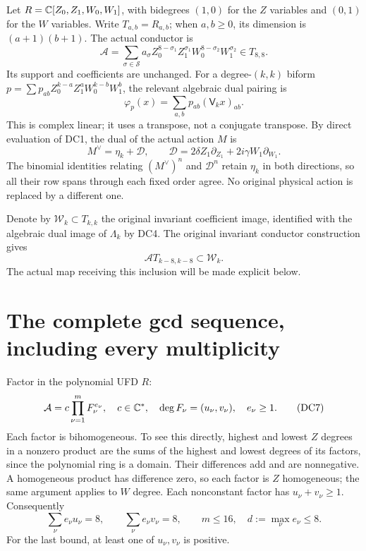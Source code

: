 \documentclass[11pt]{article}
\begin{document}
Let $R=\mathbb C[Z_0,Z_1,W_0,W_1]$, with bidegrees $(1,0)$ for the $Z$
variables and $(0,1)$ for the $W$ variables.  Write $T_{a,b}=R_{a,b}$;
when $a,b\ge0$, its dimension is $(a+1)(b+1)$.  The actual conductor is
\[
 \mathcal A=\sum_{\sigma\in\mathcal S}a_\sigma
 Z_0^{8-\sigma_1}Z_1^{\sigma_1}
 W_0^{8-\sigma_2}W_1^{\sigma_2}\in T_{8,8}.                       \tag{DC3}
\]
Its support and coefficients are unchanged.  For a degree-$(k,k)$
biform $p=\sum p_{ab}Z_0^{k-a}Z_1^aW_0^{k-b}W_1^b$, the relevant
algebraic dual pairing is
\[
 \varphi_p(x)=\sum_{a,b}p_{ab}(\mathsf V_kx)_{ab}.                \tag{DC4}
\]
This is complex linear; it uses a transpose, not a conjugate transpose.
By direct evaluation of DC1, the dual of the actual action $M$ is
\[
 M^\vee=\eta_k+\mathcal D,\qquad
 \mathcal D=2\delta Z_1\partial_{Z_1}
                 +2i\gamma W_1\partial_{W_1}.                   \tag{DC5}
\]
The binomial identities relating $(M^\vee)^n$ and $\mathcal D^n$
retain $\eta_k$ in both directions, so all their row spans through
each fixed order agree.  No original physical action is replaced by a
different one.

Denote by $\mathcal W_k\subset T_{k,k}$ the original invariant
coefficient image, identified with the algebraic dual image of
$\Lambda_k$ by DC4.  The original invariant conductor construction
gives
\[
 \mathcal A T_{k-8,k-8}\subset\mathcal W_k.                       \tag{DC6}
\]
The actual map receiving this inclusion will be made explicit below.

\section{The complete gcd sequence, including every multiplicity}
Factor in the polynomial UFD $R$:
\[
 \mathcal A=c\prod_{\nu=1}^{m}F_\nu^{e_\nu},\quad
 c\in\mathbb C^*,\quad \deg F_\nu=(u_\nu,v_\nu),
 \quad e_\nu\ge1.                                               \tag{DC7}
\]
Each factor is bihomogeneous.  To see this directly, highest and
lowest $Z$ degrees in a nonzero product are the sums of the highest
and lowest degrees of its factors, since the polynomial ring is a
domain.  Their differences add and are nonnegative.  A homogeneous
product has difference zero, so each factor is $Z$ homogeneous;
the same argument applies to $W$ degree.  Each nonconstant factor has
$u_\nu+v_\nu\ge1$.  Consequently
\[
 \sum_\nu e_\nu u_\nu=8,\qquad
 \sum_\nu e_\nu v_\nu=8,\qquad m\le16,
 \quad d:=\max_\nu e_\nu\le8.                                   \tag{DC8}
\]
For the last bound, at least one of $u_\nu,v_\nu$ is positive.
\end{document}
